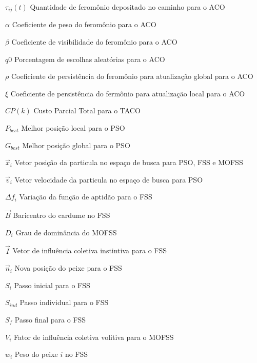 \begin{simbolos}
    \item[$ \tau_{ij}(t) $] Quantidade de feromônio depositado no caminho para o ACO
    \item[$ \alpha $] Coeficiente de peso do feromônio para o ACO
    \item[$ \beta $] Coeficiente de visibilidade do feromônio para o ACO
    \item[$ q0 $] Porcentagem de escolhas aleatórias para o ACO
    \item[$ \rho $] Coeficiente de persistência do feromônio para atualização global para o ACO
    \item[$ \xi $] Coeficiente de persistência do fermônio para atualização local para o ACO
    \item[$ CP(k) $] Custo Parcial Total para o TACO
    \item[$ P_{best} $] Melhor posição local para o PSO
    \item[$ G_{best} $] Melhor posição global para o PSO
    \item[$ \vec{x}_{i} $] Vetor posição da particula no espaço de busca para PSO, FSS e MOFSS
    \item[$ \vec{v}_{i} $] Vetor velocidade da particula no espaço de busca para PSO
    \item[$ \Delta f_{i} $] Variação da função de aptidão para o FSS
    \item[$ \vec{B} $] Baricentro do cardume no FSS
    \item[$ D_{i} $] Grau de dominância do MOFSS
    \item[$ \vec{I} $] Vetor de influência coletiva instintiva para o FSS
    \item[$ \vec{n}_{i} $] Nova posição do peixe para o FSS
    \item[$ S_{i} $] Passo inicial para o FSS
    \item[$ S_{ind} $] Passo individual para o FSS
    \item[$ S_{f} $] Passo final para o FSS
    \item[$ V_{i} $] Fator de influência coletiva volitiva para o MOFSS
    \item[$ w_{i} $] Peso do peixe $i$ no FSS
\end{simbolos}